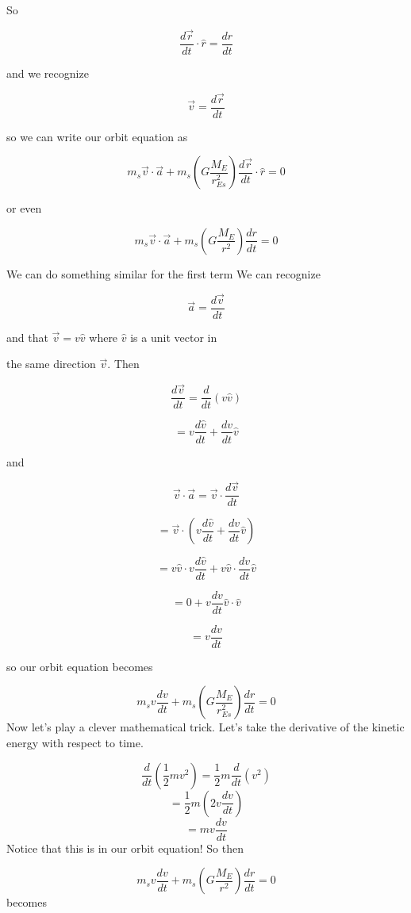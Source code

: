 So 

$$\frac{d\overrightarrow{r}}{dt}\cdot \hat{r}=\frac{dr}{dt}$$

and we recognize 

$$\overrightarrow{v}=\frac{d\overrightarrow{r}}{dt}$$

so we can write our orbit equation as%

$$m_{s}\overrightarrow{v}\cdot \overrightarrow{a}+m_{s}\left( G\frac{M_{E}}{r_{Es}^{2}}\right) \frac{d\overrightarrow{r}}{dt}\cdot \hat{r}=0$$

or even 

$$m_{s}\overrightarrow{v}\cdot \overrightarrow{a}+m_{s}\left( G\frac{M_{E}}{r^{2}}\right) \frac{dr}{dt}=0$$

We can do something similar for the first term We can recognize 

$$\overrightarrow{a}=\frac{d\overrightarrow{v}}{dt}$$

and that $\overrightarrow{v}=v\hat{v}$ where $\hat{v}$ is a unit vector in

the same direction $\overrightarrow{v}.$ Then 

$$\frac{d\overrightarrow{v}}{dt}=\frac{d}{dt}\left( v\hat{v}\right) $$

$$=v\frac{d\hat{v}}{dt}+\frac{dv}{dt}\hat{v}$$

and 

$$\overrightarrow{v}\cdot \overrightarrow{a}=\overrightarrow{v}\cdot \frac{d\overrightarrow{v}}{dt}$$

$$=\overrightarrow{v}\cdot \left( v\frac{d\hat{v}}{dt}+\frac{dv}{dt}\hat{v}\right)
$$

$$=v\hat{v}\cdot v\frac{d\hat{v}}{dt}+v\hat{v}\cdot \frac{dv}{dt}\hat{v}$$

$$=0+v\frac{dv}{dt}\hat{v}\cdot \hat{v}$$

$$=v\frac{dv}{dt}$$

so our orbit equation becomes

$$m_{s}v\frac{dv}{dt}+m_{s}\left( G\frac{M_{E}}{r_{Es}^{2}}\right) \frac{dr}{dt}=0
$$
Now let's play a clever mathematical trick. Let's take the derivative of the
kinetic energy with respect to time.

$$\frac{d}{dt}\left( \frac{1}{2}mv^{2}\right) =\frac{1}{2}m\frac{d}{dt}\left(v^{2}\right) 
$$%
$$=\frac{1}{2}m\left( 2v\frac{dv}{dt}\right) 
$$%
$$=mv\frac{dv}{dt}$$%
Notice that this is in our orbit equation! So then%

$$m_{s}v\frac{dv}{dt}+m_{s}\left( G\frac{M_{E}}{r^{2}}\right) \frac{dr}{dt}=0
$$%
becomes 


